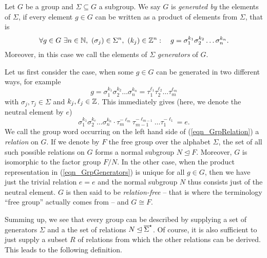 \begin{definition}
Let $G$ be a group and $\Sigma \subseteq G$ a subgroup. We say $G$ is \emph{generated by} the elements of $\Sigma$, if every element $g \in G$ can be written as a product of elements from $\Sigma$, that is 
\begin{equation}
\label{eqn_GrpGenerators}
\forall g \in G\ \exists n \in \mathbb{N},\ (\sigma_j) \in \Sigma^n,\ (k_j) \in \mathbb{Z}^n:\quad 
g = \sigma_1^{k_1} \sigma_2^{k_2} \dots \sigma_n^{k_n}.
\end{equation}
Moreover, in this case we call the elements of $\Sigma$ \emph{generators} of $G$. 
\end{definition}

Let us first consider the case, when some $g \in G$ can be generated in two  different ways, for example
\begin{equation*}
g = \sigma_1^{k_1} \sigma_2^{k_2} \dots \sigma_n^{k_n} 
  = \tau_1^{\ell_1} \tau_2^{\ell_2} \dots \tau_m^{\ell_m}
\end{equation*}
with $\sigma_j, \tau_j \in \Sigma$ and $k_j, \ell_j \in \mathbb{Z}$. This immediately gives (here, we denote the neutral element by $e$)
\begin{equation}
\label{eqn_GrpRelation}
\sigma_1^{k_1} \sigma_2^{k_e} \dots \sigma_n^{k_n} \cdot
\tau_m^{-\ell_m} \tau_{m-1}^{-\ell_{m-1}} \dots \tau_1^{-\ell_1} = e.
\end{equation}
We call the group word occurring on the left hand side of (\ref{eqn_GrpRelation}) a \emph{relation} on $G$. If we denote by $F$ the free group over the alphabet $\Sigma$, the set of all such possible relations on $G$ forms a normal subgroup $N \unlhd F$. Moreover, $G$ is isomorphic to the factor group $F/N$. In the other case, when the product representation in (\ref{eqn_GrpGenerators}) is unique for all $g \in G$, then we have just the trivial relation $e = e$ and the normal subgroup $N$ thus consists just of the neutral element. $G$ is then said to be \emph{relation-free} -- that is where the terminology ``free group'' actually comes from -- and $G \cong F$. 

Summing up, we see that every group can be described by supplying a set of generators $\Sigma$ and a the set of relations $N \unlhd {\overline{\Sigma}}^{\star}$. Of course, it is also sufficient to just supply a subset $R$ of relations from which the other relations can be derived. This leads to the following definition.

